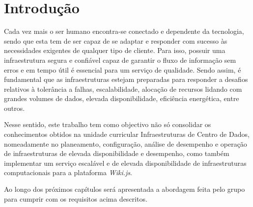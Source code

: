 \section{Introdução}

Cada vez mais o ser humano encontra-se conectado e dependente da tecnologia, sendo que esta tem de ser capaz de se adaptar e responder com sucesso às necessidades exigentes de qualquer tipo de cliente. Para isso, possuir uma infraestrutura segura e confiável capaz de garantir o fluxo de informação sem erros e em tempo útil é essencial para um serviço de qualidade. Sendo assim, é fundamental que as infraestruturas estejam preparadas para responder a desafios relativos à tolerância a falhas, escalabilidade, alocação de recursos lidando com grandes volumes de dados, elevada disponibilidade, eficiência energética, entre outros.

Nesse sentido, este trabalho tem como objectivo não só consolidar os conhecimentos obtidos na unidade curricular Infraestruturas de Centro de Dados, nomeadamente no planeamento, configuração, análise de desempenho e operação de infraestruturas de elevada disponibilidade e desempenho, como também implementar um serviço escalável e de elevada disponibilidade de infraestruturas computacionais para a plataforma \textit{Wiki.js}. 

Ao longo dos próximos capítulos será apresentada a abordagem feita pelo grupo para cumprir com os requisitos acima descritos.
\pagebreak